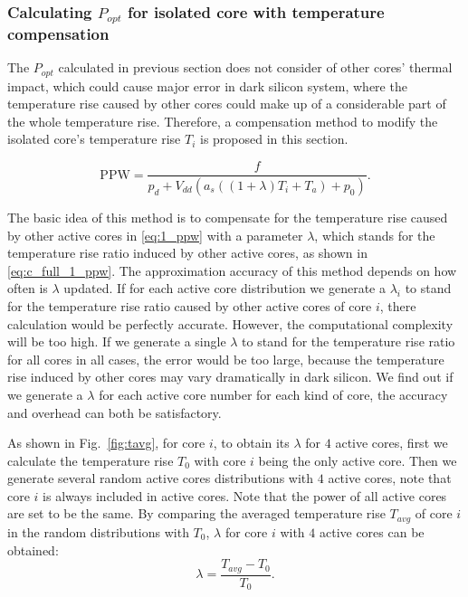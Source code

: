 \subsubsection{Calculating $P_{opt}$ for isolated core with temperature compensation}
The $P_{opt}$ calculated in previous section does not consider of other cores' thermal impact, which could cause major error in dark silicon system, where the temperature rise caused by other cores could make up of a considerable part of the whole temperature rise. Therefore, a compensation method to modify the isolated core's temperature rise $T_{i}$ is proposed in this section.

\begin{equation}\label{eq:c_full_1_ppw}
\text{PPW}=\frac{f}{p_{d}+V_{dd}(a_{s}((1+\lambda)T_{i}+T_{a})+p_{0})}.
\end{equation}

The basic idea of this method is to compensate for the temperature rise caused by other active cores in \eqref{eq:1_ppw} with a parameter $\lambda$, which stands for the temperature rise ratio induced by other active cores, as shown in \eqref{eq:c_full_1_ppw}. The approximation accuracy of this method depends on how often is $\lambda$ updated. If for each active core distribution we generate a $\lambda_{i}$ to stand for the temperature rise ratio caused by other active cores of core $i$, there calculation would be perfectly accurate. However, the computational complexity will be too high. If we generate a single $\lambda$ to stand for the temperature rise ratio for all cores in all cases, the error would be too large, because the temperature rise induced by other cores may vary dramatically in dark silicon. We find out if we generate a $\lambda$ for each active core number for each kind of core, the accuracy and overhead can both be satisfactory. 


As shown in Fig.~\ref{fig:tavg}, for core $i$, to obtain its $\lambda$ for $4$ active cores, first we calculate the temperature rise $T_{0}$ with core $i$ being the only active core. Then we generate several random active cores distributions with $4$ active cores, note that core $i$ is always included in active cores. Note that the power of all active cores are set to be the same. By comparing the averaged temperature rise $T_{avg}$ of core $i$ in the random distributions with $T_{0}$, $\lambda$ for core $i$ with $4$ active cores can be obtained:
\begin{equation}\label{eq:lambda}
\lambda = \frac{T_{avg}-T_{0}}{T_{0}}.
\end{equation}

